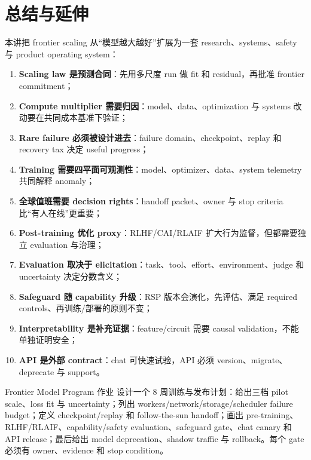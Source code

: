 \section{总结与延伸}

本讲把 frontier scaling 从“模型越大越好”扩展为一套 research、systems、safety 与 product operating system：

\begin{enumerate}
  \item \textbf{Scaling law 是预测合同}：先用多尺度 run 做 fit 和 residual，再批准 frontier commitment；
  \item \textbf{Compute multiplier 需要归因}：model、data、optimization 与 systems 改动要在共同成本基准下验证；
  \item \textbf{Rare failure 必须被设计进去}：failure domain、checkpoint、replay 和 recovery tax 决定 useful progress；
  \item \textbf{Training 需要四平面可观测性}：model、optimizer、data、system telemetry 共同解释 anomaly；
  \item \textbf{全球值班需要 decision rights}：handoff packet、owner 与 stop criteria 比“有人在线”更重要；
  \item \textbf{Post-training 优化 proxy}：RLHF/CAI/RLAIF 扩大行为监督，但都需要独立 evaluation 与治理；
  \item \textbf{Evaluation 取决于 elicitation}：task、tool、effort、environment、judge 和 uncertainty 决定分数含义；
  \item \textbf{Safeguard 随 capability 升级}：RSP 版本会演化，先评估、满足 required controls、再训练/部署的原则不变；
  \item \textbf{Interpretability 是补充证据}：feature/circuit 需要 causal validation，不能单独证明安全；
  \item \textbf{API 是外部 contract}：chat 可快速试验，API 必须 version、migrate、deprecate 与 support。
\end{enumerate}

\begin{importantbox}{Frontier Model Program 作业}
设计一个 8 周训练与发布计划：给出三档 pilot scale、loss fit 与 uncertainty；列出 workers/network/storage/scheduler failure budget；定义 checkpoint/replay 和 follow-the-sun handoff；画出 pre-training、RLHF/RLAIF、capability/safety evaluation、safeguard gate、chat canary 和 API release；最后给出 model deprecation、shadow traffic 与 rollback。每个 gate 必须有 owner、evidence 和 stop condition。
\end{importantbox}

